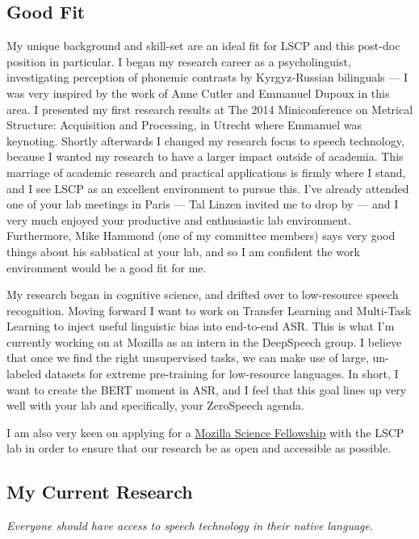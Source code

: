 \documentclass[12pt,a4paper]{article}
\begin{document}
\subsection*{Good Fit}

My unique background and skill-set are an ideal fit for LSCP and this post-doc position in particular. I began my research career as a psycholinguist, investigating perception of phonemic contrasts by Kyrgyz-Russian bilinguals --- I was very inspired by the work of Anne Cutler and Emmanuel Dupoux in this area. I presented my first research results at The 2014 Miniconference on Metrical Structure: Acquisition and Processing, in Utrecht where Emmanuel was keynoting. Shortly afterwards I changed my research focus to speech technology, because I wanted my research to have a larger impact outside of academia. This marriage of academic research and practical applications is firmly where I stand, and I see LSCP as an excellent environment to pursue this. I've already attended one of your lab meetings in Paris --- Tal Linzen invited me to drop by --- and I very much enjoyed your productive and enthusiastic lab environment. Furthermore, Mike Hammond (one of my committee members) says very good things about his sabbatical at your lab, and so I am confident the work environment would be a good fit for me.

My research began in cognitive science, and drifted over to low-resource speech recognition. Moving forward I want to work on Transfer Learning and Multi-Task Learning to inject useful linguistic bias into end-to-end ASR. This is what I'm currently working on at Mozilla as an intern in the DeepSpeech group. I believe that once we find the right unsupervised tasks, we can make use of large, un-labeled datasets for extreme pre-training for low-resource languages. In short, I want to create the BERT moment in ASR, and I feel that this goal lines up very well with your lab and specifically, your ZeroSpeech agenda.

I am also very keen on applying for a \href{https://science.mozilla.org/programs/fellowships}{Mozilla Science Fellowship} with the LSCP lab in order to ensure that our research be as open and accessible as possible.

\subsection*{My Current Research}

\begin{center}
\textit{Everyone should have access to speech technology in their native language.}
\end{center}
\end{document}
